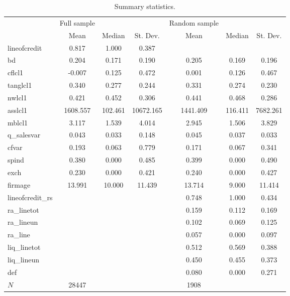 \begin{table}[htbp]\centering
\def\sym#1{\ifmmode^{#1}\else\(^{#1}\)\fi}
\caption{Summary statistics.}
\begin{tabular}{l*{2}{ccc}}
\toprule
            & Full sample&            &            &Random sample&            &            \\
            &        Mean&      Median&    St. Dev.&        Mean&      Median&    St. Dev.\\
\midrule
lineofcredit&       0.817&       1.000&       0.387&            &            &            \\
bd          &       0.204&       0.171&       0.190&       0.205&       0.169&       0.196\\
cflcl1      &      -0.007&       0.125&       0.472&       0.001&       0.126&       0.467\\
tanglcl1    &       0.340&       0.277&       0.244&       0.331&       0.274&       0.230\\
nwlcl1      &       0.421&       0.452&       0.306&       0.441&       0.468&       0.286\\
asslcl1     &    1608.557&     102.461&   10672.165&    1441.409&     116.411&    7682.261\\
mblcl1      &       3.117&       1.539&       4.014&       2.945&       1.506&       3.829\\
q\_salesvar  &       0.043&       0.033&       0.148&       0.045&       0.037&       0.033\\
cfvar       &       0.193&       0.063&       0.779&       0.171&       0.067&       0.341\\
spind       &       0.380&       0.000&       0.485&       0.399&       0.000&       0.490\\
exch        &       0.230&       0.000&       0.421&       0.240&       0.000&       0.427\\
firmage     &      13.991&      10.000&      11.439&      13.714&       9.000&      11.414\\
lineofcredit\_rs&            &            &            &       0.748&       1.000&       0.434\\
ra\_linetot  &            &            &            &       0.159&       0.112&       0.169\\
ra\_lineun   &            &            &            &       0.102&       0.069&       0.125\\
ra\_line     &            &            &            &       0.057&       0.000&       0.097\\
liq\_linetot &            &            &            &       0.512&       0.569&       0.388\\
liq\_lineun  &            &            &            &       0.450&       0.455&       0.373\\
def         &            &            &            &       0.080&       0.000&       0.271\\
\midrule
\(N\)       &       28447&            &            &        1908&            &            \\
\bottomrule
\end{tabular}
\end{table}
